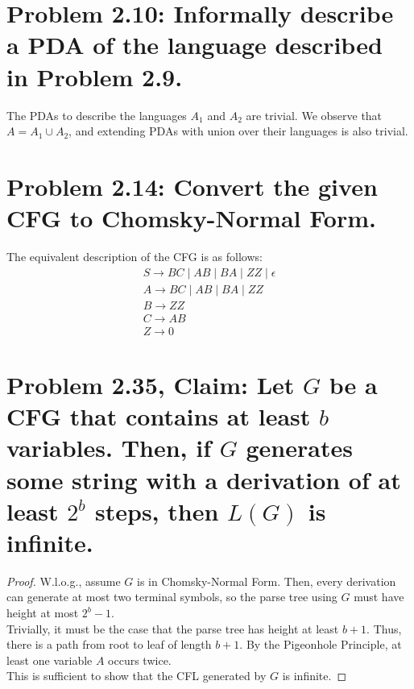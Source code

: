 \documentclass[12pt]{article}
\begin{document}
\section*{Problem 2.10: Informally describe a PDA of the language described in Problem 2.9.}
The PDAs to describe the languages $A_{1}$ and $A_{2}$ are trivial. We observe that $A = A_{1} \cup A_{2}$, and extending PDAs with union over their languages is also trivial.

\section*{Problem 2.14: Convert the given CFG to Chomsky-Normal Form.}
The equivalent description of the CFG is as follows:
\begin{align*}
  S \rightarrow BC \mid AB \mid BA \mid ZZ \mid \epsilon \\
  A \rightarrow BC \mid AB \mid BA \mid ZZ \\
  B \rightarrow ZZ \\
  C \rightarrow AB \\
  Z \rightarrow 0
\end{align*}

\section*{Problem 2.35, Claim: Let $G$ be a CFG that contains at least $b$ variables. Then, if $G$ generates some string with a derivation of at least $2^{b}$ steps, then $L(G)$ is infinite.}
\begin{proof}
  W.l.o.g., assume $G$ is in Chomsky-Normal Form. Then, every derivation can generate at most two terminal symbols, so the parse tree using $G$ must have height at most $2^{b} - 1$. \\
  \newline
  Trivially, it must be the case that the parse tree has height at least $b + 1$. Thus, there is a path from root to leaf of length $b + 1$. By the Pigeonhole Principle, at least one variable $A$ occurs twice. \\
  \newline
  This is sufficient to show that the CFL generated by $G$ is infinite.
\end{proof}
\end{document}
